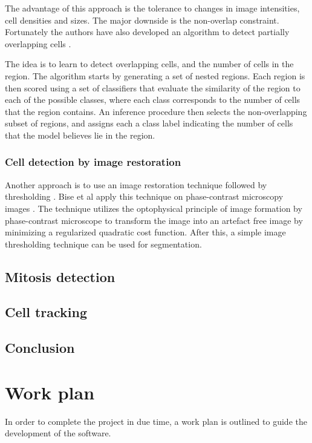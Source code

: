 \documentclass[12pt,a4paper,openany]{book}
\begin{document}
The advantage of this approach is the tolerance to changes in image intensities, cell densities and sizes. The major downside is the non-overlap constraint. Fortunately the authors have also developed an algorithm to detect partially overlapping cells \cite{arteta13}. 

The idea is to learn to detect overlapping cells, and the number of cells in the region. The algorithm starts by generating a set of nested regions. Each region is then scored using a set of classifiers that evaluate the similarity of the region to each of the possible classes, where each class corresponds to the number of cells that the region contains. An inference procedure then selects the non-overlapping subset of regions, and assigns each a class label indicating the number of cells that the model believes lie in the region. 

\subsection{Cell detection by image restoration}

Another approach is to use an image restoration technique followed by thresholding \cite{bise11} \cite{huh13}. Bise et al \cite{bise11} apply this technique on phase-contrast microscopy images . The technique utilizes the optophysical principle of image formation by phase-contrast microscope to transform the image into an artefact free image by minimizing a regularized quadratic cost function. After this, a simple image thresholding technique can be used for segmentation.

\section{Mitosis detection}
\label{sec:mitosis}
\section{Cell tracking}
\label{sec:tracking}
\section{Conclusion}
\label{sec:conclusionmethods}

\chapter{Work plan}
\label{chap:workplan}

In order to complete the project in due time, a work plan is outlined to guide the development of the software.
\end{document}
